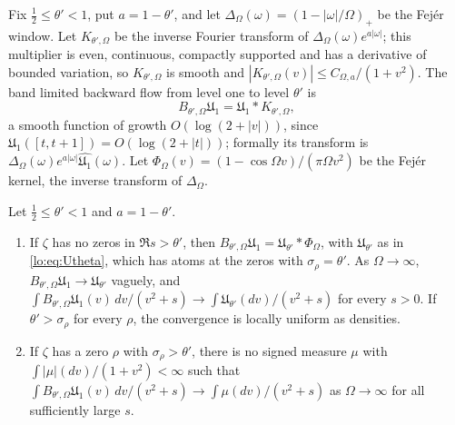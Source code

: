 Fix $\tfrac12\le\theta'<1$, put $a=1-\theta'$, and let $\Delta_\Omega(\omega)=(1-|\omega|/\Omega)_+$ be the Fej\'er window. Let $K_{\theta',\Omega}$ be the inverse Fourier transform of $\Delta_\Omega(\omega)e^{a|\omega|}$; this multiplier is even, continuous, compactly supported and has a derivative of bounded variation, so $K_{\theta',\Omega}$ is smooth and $|K_{\theta',\Omega}(v)|\le C_{\Omega,a}/(1+v^2)$. The band limited backward flow from level one to level $\theta'$ is
\begin{equation}\label{lo:eq:backward}
B_{\theta',\Omega}\mathfrak U_1=\mathfrak U_1*K_{\theta',\Omega},
\end{equation}
a smooth function of growth $O(\log(2+|v|))$, since $\mathfrak U_1([t,t+1])=O(\log(2+|t|))$; formally its transform is $\Delta_\Omega(\omega)e^{a|\omega|}\widehat{\mathfrak U_1}(\omega)$. Let $\Phi_\Omega(v)=(1-\cos\Omega v)/(\pi\Omega v^2)$ be the Fej\'er kernel, the inverse transform of $\Delta_\Omega$.

\begin{theorem}\label{lo:thm:dichotomy}
Let $\tfrac12\le\theta'<1$ and $a=1-\theta'$.
\begin{enumerate}
\item[(i)] If $\zeta$ has no zeros in $\Re s>\theta'$, then $B_{\theta',\Omega}\mathfrak U_1=\mathfrak U_{\theta'}*\Phi_\Omega$, with $\mathfrak U_{\theta'}$ as in \eqref{lo:eq:Utheta}, which has atoms at the zeros with $\sigma_\rho=\theta'$. As $\Omega\to\infty$, $B_{\theta',\Omega}\mathfrak U_1\to\mathfrak U_{\theta'}$ vaguely, and $\int B_{\theta',\Omega}\mathfrak U_1(v)\,dv/(v^2+s)\to\int\mathfrak U_{\theta'}(dv)/(v^2+s)$ for every $s>0$. If $\theta'>\sigma_\rho$ for every $\rho$, the convergence is locally uniform as densities.
\item[(ii)] If $\zeta$ has a zero $\rho$ with $\sigma_\rho>\theta'$, there is no signed measure $\mu$ with $\int|\mu|(dv)/(1+v^2)<\infty$ such that $\int B_{\theta',\Omega}\mathfrak U_1(v)\,dv/(v^2+s)\to\int\mu(dv)/(v^2+s)$ as $\Omega\to\infty$ for all sufficiently large $s$.
\end{enumerate}
\end{theorem}

